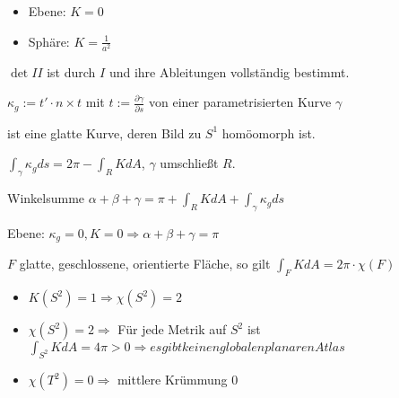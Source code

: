 \begin{bsp}
    \begin{itemize}
        \item Ebene: $K=0$
        \item Sphäre: $K=\frac{1}{a^2}$
    \end{itemize}
\end{bsp}

\begin{satz}
    $\det II$ ist durch $I$ und ihre Ableitungen vollständig bestimmt.
\end{satz}

\begin{defi}
    $\kappa_g := t'\cdot n\times t$ mit $t:=\frac{\partial \gamma}{\partial s}$
    von einer parametrisierten Kurve $\gamma$
\end{defi}

\begin{defi}
    ist eine glatte Kurve, deren Bild zu $S^1$ homöomorph ist.
\end{defi}

\begin{satz}
    $\int_\gamma \kappa_g ds = 2\pi - \int_R KdA$,
    $\gamma$ umschließt $R$.
\end{satz}

\begin{kor}
    Winkelsumme $\alpha + \beta + \gamma = \pi + \int_R KdA + \int_\gamma \kappa_g ds$
\end{kor}

\begin{bsp}
    Ebene: $\kappa_g=0,K=0 \Rightarrow \alpha + \beta + \gamma = \pi$
\end{bsp}

\begin{satz}
    $F$ glatte, geschlossene, orientierte Fläche, so gilt
    $\int_F KdA = 2\pi \cdot \chi(F)$
\end{satz}

\begin{bsp}
    \begin{itemize}
        \item $K(S^2)=1 \Rightarrow \chi(S^2)=2$
        \item $\chi(S^2)=2 \Rightarrow$ Für jede Metrik auf $S^2$ ist $\int_{S^2}KdA=4\pi>0 
            \Rightarrow es gibt keinen globalen planaren Atlas$
        \item $\chi(T^2)=0 \Rightarrow $ mittlere Krümmung 0
    \end{itemize}
\end{bsp}